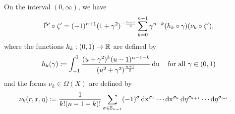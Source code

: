 \documentclass[\MainFolder/Text.tex]{subfiles}
\begin{document}
\begin{Lem} \label{Lem:FormulaAlongCurve}
On the interval $(0,\infty)$, we have
\begin{equation*}\label{Eq:FormulaAlongCurve}
\tilde{\mathrm{P}}'\circ\zeta' = (-1)^{n+1}(1+\gamma^2)^{-\frac{n-1}{2}} \sum_{k=0}^{n-1} \gamma^{n-k} (h_{k}\circ\gamma)(\nu_{k}\circ\zeta'), 
\end{equation*}
where the functions $h_{k}: (0,1)\rightarrow \mathbb{R}$ are defined by
\begin{equation*}
  h_{k}(\gamma)\coloneqq \int_{-1}^1 \frac{(u+\gamma^2)^{k}(u-1)^{n-1-k}}{(u^2+\gamma^2)^{\frac{n+1}{2}}} \operatorname{du} \quad \text{for all }\gamma\in (0,1)
\end{equation*}
and the forms $\nu_{k}\in \Omega(X)$ are defined by
\begin{align*}
 \nu_{k}(r,x,\eta) &\coloneqq \frac{1}{k!(n-1-k)!}\sum_{\sigma\in \mathbb{S}_{n-1}} (-1)^\sigma \operatorname{dx^{\sigma_1}}\dotsm
\operatorname{dx^{\sigma_k}} \operatorname{d\eta^{\sigma_{k+1}}} \dotsm \operatorname{d\eta^{\sigma_{n-1}}}.
\end{align*}
\end{Lem}
\end{document}
